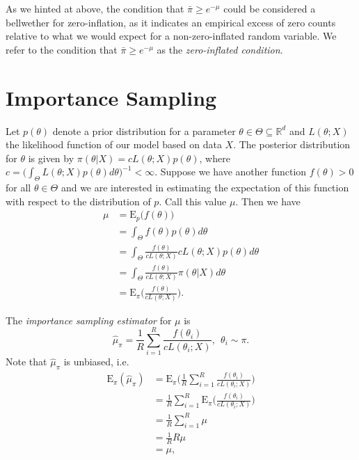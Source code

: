 \documentclass[
  12pt]{article}
\begin{document}
As we hinted at above, the condition that \(\bar{\pi} \geq e^{-\mu}\)
could be considered a bellwether for zero-inflation, as it indicates an
empirical excess of zero counts relative to what we would expect for a
non-zero-inflated random variable. We refer to the condition that
\(\bar{\pi} \geq e^{-\mu}\) as the \emph{zero-inflated condition}.

\section{Importance Sampling}\label{importance-sampling}

Let \(p(\theta)\) denote a prior distribution for a parameter
\(\theta \in \Theta \subseteq \mathbb{R}^d\) and \(L(\theta; X)\) the
likelihood function of our model based on data \(X\). The posterior
distribution for \(\theta\) is given by
\(\pi(\theta | X) = cL(\theta;X)p(\theta)\), where
\(c = \big(\int_{\Theta} L(\theta;X) p(\theta) d\theta\big)^{-1} < \infty.\)
Suppose we have another function \(f(\theta) >0\) for all
\(\theta \in \Theta\) and we are interested in estimating the
expectation of this function with respect to the distribution of \(p\).
Call this value \(\mu\). Then we have \[
\begin{aligned}
\mu &= \text{E}_p\big(f(\theta)\big) \\
    &= \int_{\Theta} f(\theta)p(\theta) d\theta \\
    &= \int_{\Theta} \frac{f(\theta)}{c L(\theta;X)} c L(\theta;X) p(\theta) d\theta \\
    &= \int_{\Theta} \frac{f(\theta)}{c L(\theta;X)} \pi(\theta | X) d\theta \\
    &= \text{E}_{\pi}\Bigg(\frac{f(\theta)}{c L(\theta;X)}\Bigg).
\end{aligned}
\]

The \emph{importance sampling estimator} for \(\mu\) is \[
\hat{\mu}_{\pi} = \frac{1}{R} \sum_{i=1}^R \frac{f(\theta_i)}{c L(\theta_i;X)}, \> \> \theta_i \sim \pi.
\] Note that \(\hat{\mu}_{\pi}\) is unbiased, i.e.~\[
\begin{aligned}
\text{E}_{\pi}(\hat{\mu}_{\pi}) &= \text{E}_{\pi}\Bigg(\frac{1}{R} \sum_{i=1}^R \frac{f(\theta_i)}{c L(\theta_i;X)}\Bigg) \\
                                &= \frac{1}{R} \sum_{i=1}^R\text{E}_{\pi}\Bigg(\frac{f(\theta_i)}{c L(\theta_i;X)}\Bigg) \\
                                &= \frac{1}{R} \sum_{i=1}^R \mu \\
                                &= \frac{1}{R} R\mu \\
                                &= \mu,
\end{aligned}
\]
\end{document}
